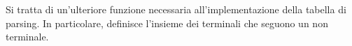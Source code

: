 \documentclass{subfiles}
\begin{document}
Si tratta di un'ulteriore funzione necessaria all'implementazione della tabella di parsing.
In particolare, definisce l'insieme dei terminali che seguono un non terminale.

\end{document}
